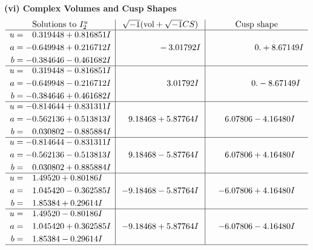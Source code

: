 \documentclass[1p]{elsarticle_modified}
\theoremstyle{definition}
\newcommand{\I}{\sqrt{-1}}
\begin{document}
\newpage\flushleft \textbf{(vi) Complex Volumes and Cusp Shapes}
$$\begin{array}{c|c|c}  
\text{Solutions to }I^u_{2}& \I (\text{vol} + \sqrt{-1}CS) & \text{Cusp shape}\\
 \hline 
\begin{aligned}
u &= \phantom{-}0.319448 + 0.816851 I \\
a &= -0.649948 + 0.216712 I \\
b &= -0.384646 - 0.461682 I\end{aligned}
 & \phantom{-0.000000 } -3.01792 I & \phantom{-0.000000 -}0. + 8.67149 I \\ \hline\begin{aligned}
u &= \phantom{-}0.319448 - 0.816851 I \\
a &= -0.649948 - 0.216712 I \\
b &= -0.384646 + 0.461682 I\end{aligned}
 & \phantom{-0.000000 -}3.01792 I & \phantom{-0.000000 } 0. - 8.67149 I \\ \hline\begin{aligned}
u &= -0.814644 + 0.831311 I \\
a &= -0.562136 + 0.513813 I \\
b &= \phantom{-}0.030802 - 0.885884 I\end{aligned}
 & \phantom{-}9.18468 + 5.87764 I & \phantom{-}6.07806 - 4.16480 I \\ \hline\begin{aligned}
u &= -0.814644 - 0.831311 I \\
a &= -0.562136 - 0.513813 I \\
b &= \phantom{-}0.030802 + 0.885884 I\end{aligned}
 & \phantom{-}9.18468 - 5.87764 I & \phantom{-}6.07806 + 4.16480 I \\ \hline\begin{aligned}
u &= \phantom{-}1.49520 + 0.80186 I \\
a &= \phantom{-}1.045420 - 0.362585 I \\
b &= \phantom{-}1.85384 + 0.29614 I\end{aligned}
 & -9.18468 - 5.87764 I & -6.07806 + 4.16480 I \\ \hline\begin{aligned}
u &= \phantom{-}1.49520 - 0.80186 I \\
a &= \phantom{-}1.045420 + 0.362585 I \\
b &= \phantom{-}1.85384 - 0.29614 I\end{aligned}
 & -9.18468 + 5.87764 I & -6.07806 - 4.16480 I\\
 \hline 
 \end{array}$$\newpage\newpage\renewcommand{\arraystretch}{1}
\end{document}
